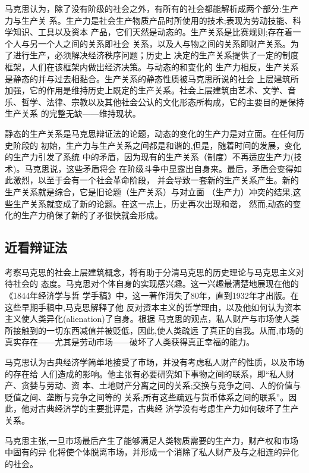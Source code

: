 马克思认为，除了没有阶级的社会之外，有所有的社会都能解析成两个部分:生产力与生产关
系。生产力是社会生产物质产品时所使用的技术;表现为劳动技能、科学知识、工具以及资本
产品，它们天然是动态的。生产关系是比赛规则;存在着一个人与另一个人之间的关系即社会
关系，以及人与物之间的关系即财产关系。为了进行生产，必须解决经济秩序问题；历史上
决定的生产关系提供了一定的制度框架，人们在该框架内做出经济决策。与动态的和变化的
生产力相反，生产关系是静态的并与过去相黏合。生产关系的静态性质被马克思所说的社会
上层建筑所加强，它的作用是维持历史上既定的生产关系。社会上层建筑由艺术、文学、音
乐、哲学、法律、宗教以及其他社会公认的文化形态所构成，它的主要目的是保持生产关系
的完整无缺——维持现状。

静态的生产关系是马克思辩证法的论题，动态的变化的生产力是对立面。在任何历史阶段的
初始，生产力与生产关系之间都是和谐的,但是，随着时间的发展，变化的生产力引发了系统
中的矛盾，因为现有的生产关系（制度）不再适应生产力(技术)。马克思说，这些矛盾将会
在阶级斗争中显露出自身来。最后，矛盾会变得如此激烈，以至于会有一个社会革命阶段，
并会导致一套新的生产关系产生。新的生产关系就是综合，它是旧论题（生产关系）与对立面
（生产力）冲突的结果,这些生产关系就变成了新的论题。在这一点上，历史再次出现和谐，
然而,动态的变化的生产力确保了新的了矛很快就会形成。

\subsection{近看辩证法}

考察马克思的社会上层建筑概念，将有助于分清马克思的历史理论与马克思主义对待社会的
态度。马克思对个体自身的实现感兴趣。这一兴趣最清楚地展现在他的《1844年经济学与哲
学手稿》中，这一著作消失了80年，直到1932年才出版。在这些早期手稿中,马克思解释了他
反对资本主义的哲学理由，以及他如何认为资本主义使人类异化(alienation)了自身。根据
马克思的观点，私人财产与市场使人类所接触到的一切东西减值并被贬低，因此,使人类疏远
了真正的自我。从而,市场的真实存在——尤其是劳动市场——破坏了人类获得真正幸福的能力。

马克思认为古典经济学简单地接受了市场，并没有考虑私人财产的性质，以及市场的存在给
人们造成的影响。他主张有必要研究如下事物之间的联系，即“私人财产、贪婪与劳动、资
本、土地财产分离之间的关系;交换与竞争之间、人的价值与贬值之间、垄断与竞争之间等的
关系;所有这些疏远与货币体系之间的联系”。因此，他对古典经济学的主要批评是，古典经
济学没有考虑生产力如何破坏了生产关系。

马克思主张,一旦市场最后产生了能够满足人类物质需要的生产力，财产权和市场中固有的异
化将使个体脱离市场，并形成一个消除了私人财产及与之相连的异化的社会。

